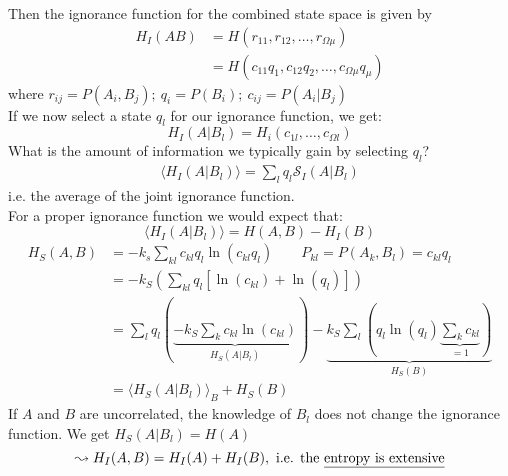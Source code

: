 \begin{enumerate}[label={$(\arabic*)$}]
Then the ignorance function for the combined state space is given by
\begin{align*}
H_I(AB)&=H(r_{11},r_{12},\ldots,r_{\Omega\mu})\\
&=H(c_{11}q_1,c_{12}q_2,\ldots,c_{\Omega\mu}q_\mu)
\end{align*}
where $r_{ij}=P(A_i,B_j);\ q_i=P(B_i);\ c_{ij}=P(A_i|B_j)$\\
If we now select a state $q_l$ for our ignorance function, we get:
\begin{equation*}
H_I(A|B_l)=H_i(c_{1l},\ldots,c_{\Omega l})
\end{equation*}
What is the amount of information we typically gain by selecting $q_l$?
\begin{align*}
\langle H_I(A|B_l)\rangle=\sum\limits_lq_l\mathcal{S}_I(A|B_l)
\end{align*}
i.e. the average of the joint ignorance function.\\
For a proper ignorance function we would expect that:
\begin{equation*}
\langle H_I(A|B_l)\rangle=H(A,B)-H_I(B)
\end{equation*}
\begin{align*}
H_S(A,B)&=-k_s\sum\limits_{kl}c_{kl}q_l\ln(c_{kl}q_l) \qquad P_{kl}=P(A_k,B_l)=c_{kl}q_l\\
&=-k_S\left(\sum\limits_{kl}q_l\left[\ln(c_{kl})+\ln(q_l)\right]\right)\\
&=\sum\limits_{l}q_l\left(\underset{H_S(A|B_l)}{\underbrace{-k_S\sum\limits_kc_{kl}\ln(c_{kl})}}\right)-\underset{H_S(B)}{\underbrace{k_S\sum\limits_l\left(q_l\ln(q_l)\underset{=1}{\underbrace{\sum\limits_kc_{kl}}}\right)}}\\
&=\langle H_S(A|B_l)\rangle_B+H_S(B)
\end{align*}
If $A$ and $B$ are uncorrelated, the knowledge of $B_l$ does not change the ignorance function. We get $H_S(A|B_l)=H(A)$
\begin{equation*}
\leadsto H_I(A,B)=H_I(A)+H_I(B), \text{ i.e. the \underline{entropy is extensive}}
\end{equation*}
\end{enumerate}
